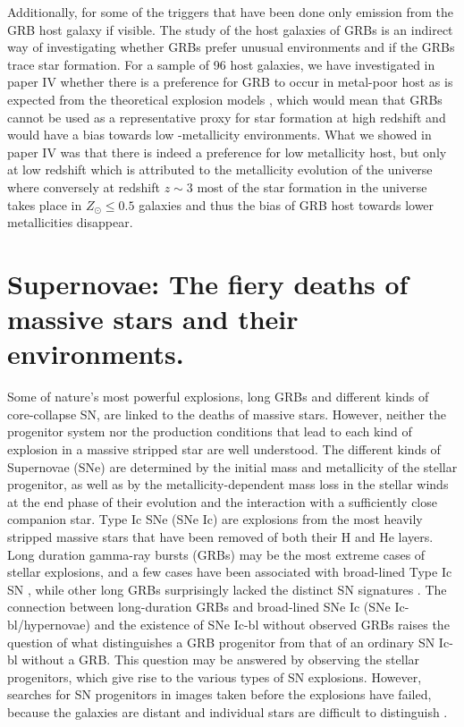 Additionally, for some of the triggers that have been done only emission from
the GRB host galaxy if visible. The study of the host galaxies of GRBs is an
indirect way of investigating whether GRBs prefer unusual environments and if
the GRBs trace star formation. For a sample of 96 host galaxies, we have
investigated in paper IV \citep{Kruhler2015} whether there is a preference for
GRB to occur in metal-poor host as is expected from the theoretical explosion
models \citep{Woosley1993}, which would mean that GRBs cannot be used as a
representative proxy for star formation at high redshift and would have a bias
towards low -metallicity environments. What we showed in paper IV was that there
is indeed a preference for low metallicity host, but only at low redshift which
is attributed to the metallicity evolution of the universe where conversely at
redshift $z \sim 3$ most of the star formation in the universe takes place in
$Z_\odot \leq 0.5$ galaxies and thus the bias of GRB host towards lower
metallicities disappear.


\section{Supernovae: The fiery deaths of massive stars and their environments.}
\label{sec:intro:sn}

Some of nature's most powerful explosions, long
  GRBs and different kinds of core-collapse SN, are linked to the
  deaths of massive stars. However, neither the progenitor system nor
  the production conditions that lead to each kind of explosion in a
  massive stripped star are well understood. The different kinds of
  Supernovae (SNe) are determined by the initial mass and metallicity
  of the stellar progenitor, as well as by the metallicity-dependent
  mass loss in the stellar winds at the end phase of their evolution
  and the interaction with a sufficiently close companion star. Type
  Ic SNe (SNe Ic) are explosions from the most heavily stripped
  massive stars that have been removed of both their H and He
  layers. Long duration gamma-ray bursts (GRBs) may be the most
  extreme cases of stellar explosions, and a few cases have been
  associated with broad-lined Type Ic SN \citep{Woosley2006}, while other long GRBs
  surprisingly lacked the distinct SN signatures \citep{Fynbo2006}. The connection
  between long-duration GRBs and broad-lined SNe Ic (SNe
  Ic-bl/hypernovae) and the existence of SNe Ic-bl without observed
  GRBs raises the question of what distinguishes a GRB progenitor from
  that of an ordinary SN Ic-bl without a GRB. This question may be
  answered by observing the stellar progenitors, which give rise to
  the various types of SN explosions. However, searches for SN
  progenitors in images taken before the explosions have failed,
  because the galaxies are distant and individual stars are difficult
  to distinguish \citep{Maund2005}.

